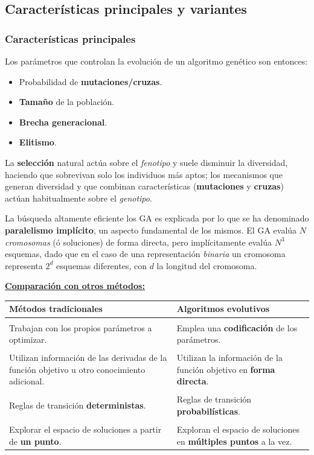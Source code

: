\documentclass[10pt,a4paper]{article}
\begin{document}
\subsection{Características principales y variantes}

\subsubsection{Características principales}

Los parámetros que controlan la evolución de un algoritmo genético son entonces:
\begin{itemize}
\item Probabilidad de \textbf{mutaciones/cruzas}.
\item \textbf{Tamaño} de la población.
\item \textbf{Brecha generacional}.
\item \textbf{Elitismo}.
\end{itemize}

La \textbf{selección} natural actúa sobre el \textit{fenotipo} y suele disminuir la diversidad, haciendo que sobrevivan solo los individuos más aptos; los mecanismos que generan diversidad y que combinan características (\textbf{mutaciones} y \textbf{cruzas}) actúan habitualmente sobre el \textit{genotipo}.

La búsqueda altamente eficiente los GA es explicada por lo que se ha denominado \textbf{paralelismo implícito}, un aspecto fundamental de los mismos. El GA evalúa $N$ \textit{cromosomas} (ó soluciones) de forma directa, pero implícitamente evalúa $N^3$ esquemas, dado que en el caso de una representación \textit{binaria} un cromosoma representa $2^d$ esquemas diferentes, con $d$ la longitud del cromosoma.

\underline{\textbf{Comparación con otros métodos:}}

\begin{tabular}{p{}|p{}}
{\bf Métodos tradicionales} & {\bf Algoritmos evolutivos} 
\\ \hline \\ [-1.5ex]
Trabajan con los propios parámetros a optimizar. &
Emplea una \textbf{codificación} de los parámetros.
\\ [1ex] \hline \\ [-1.5ex]
Utilizan información de las derivadas de la función objetivo u otro conocimiento adicional. &
Utilizan la información de la función objetivo en \textbf{forma directa}.
\\ [1ex] \hline \\ [-1.5ex]
Reglas de transición \textbf{deterministas}. &
Reglas de transición \textbf{probabilísticas}.
\\ [1ex] \hline \\ [-1.5ex]
Explorar el espacio de soluciones a partir de \textbf{un punto}. &
Exploran el espacio de soluciones en \textbf{múltiples puntos} a la vez.
\\ [1ex] \hline 
\end{tabular}
\end{document}

